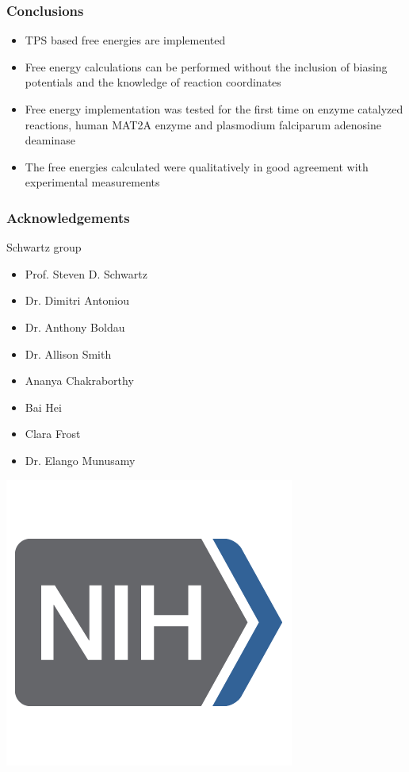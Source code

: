 \documentclass{beamer}
\begin{document}
\begin{frame}
\frametitle{Conclusions}
\begin{block}
{
    \begin{itemize}[<+-|alert@+>]
        \item  TPS based free energies are implemented 
        \item  Free energy calculations can be performed without the inclusion of 
        biasing potentials and the knowledge of reaction coordinates
        \item Free energy implementation was tested for the first time on enzyme catalyzed
        reactions, human MAT2A enzyme and plasmodium falciparum adenosine deaminase 
        \item The free energies calculated were qualitatively in good agreement with experimental
        measurements 
    \end{itemize}
}
\end{block}
\end{frame}
\begin{frame}
\frametitle{Acknowledgements}
\begin{block}{Schwartz group}
\begin{itemize}
    \item Prof. Steven D. Schwartz
    \item Dr. Dimitri Antoniou
    \item Dr. Anthony Boldau
    \item Dr. Allison Smith
    \item Ananya Chakraborthy
    \item Bai Hei
    \item Clara Frost
    \item Dr. Elango Munusamy
\end{itemize}
\end{block}
\pause
\includegraphics[scale=0.1]{figures/nih-logo.png}
\end{frame}
%
%
%
%
\end{document}

